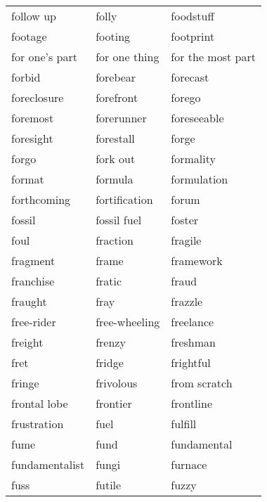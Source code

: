 \documentclass{minimal}
\begin{document}
\begin{longtable}{p{2.8cm}p{2.8cm}p{2.8cm}}
follow up & folly & foodstuff \\
footage & footing & footprint \\
for one's part & for one thing & for the most part \\
forbid & forebear & forecast \\
foreclosure & forefront & forego \\
foremost & forerunner & foreseeable \\
foresight & forestall & forge \\
forgo & fork out & formality \\
format & formula & formulation \\
forthcoming & fortification & forum \\
fossil & fossil fuel & foster \\
foul & fraction & fragile \\
fragment & frame & framework \\
franchise & fratic & fraud \\
fraught & fray & frazzle \\
free-rider & free-wheeling & freelance \\
freight & frenzy & freshman \\
fret & fridge & frightful \\
fringe & frivolous & from scratch \\
frontal lobe & frontier & frontline \\
frustration & fuel & fulfill \\
fume & fund & fundamental \\
fundamentalist & fungi & furnace \\
fuss & futile & fuzzy
\end{longtable}
\end{document}
